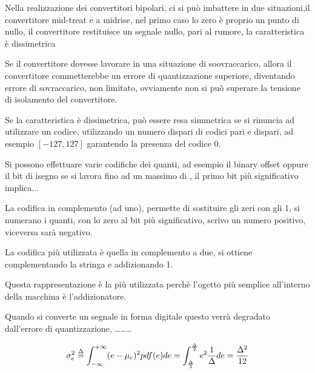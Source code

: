 Nella realizzazione dei convertitori bipolari, ci si può imbattere in due situazioni,il convertitore
mid-treat e a midrise, nel primo caso lo zero è proprio un punto di nullo, il convertitore restituisce un segnale nullo,
pari al rumore, la caratteristica è dissimetrica

Se il convertitore dovesse lavorare in una situazione di soovraccarico, allora il convertitore commetterebbe
un errore di quantizzazione superiore, diventando errore di sovraccarico, non limitato, ovviamente non si può superare
la tensione di isolamento del convertitore.

Se la caratteristica è dissimetrica, può essere resa simmetrica se si rinuncia ad utilizzare un codice,
utilizzando un numero dispari di codici pari e dispari, ad esempio $[-127,127]$ garantendo la 
presenza del codice 0.

Si possono effettuare varie codifiche dei quanti, ad esempio il binary offset oppure il bit di isegno se si lavora 
fino ad un massimo di , il primo bit più significativo implica... 

La codifica in complemento (ad uno), permette di sostituire gli zeri con gli 1, si numerano i quanti, con lo 
zero al bit più significativo, scrivo un numero positivo, viceversa sarà negativo.

La codifica più utilizzata è quella in complemento a due, si ottiene complementando la stringa e addizionando 
1.

Questa rappresentazione è la più utilizzata perchè l'ogetto più semplice all'interno della macchina
è l'addizionatore.

Quando si converte un segnale in forma digitale questo verrà degradato dall'errore di quantizzazione,
\dots \dots \dots

$$
\sigma^2_e \stackrel{\Delta}{=} \int_{-\infty}^{+\infty} (e-\mu_e)^2 pdf(e) de 
= \int_{\frac{\Delta}{2}}^{\frac{\Delta}{2}} e^2 \frac{1}{\Delta} de = \frac{\Delta^2}{12} 
$$
